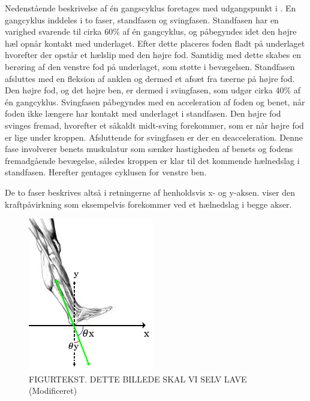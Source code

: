 Nedenstående beskrivelse af én gangscyklus foretages med udgangspunkt i . \newline
En gangcyklus inddeles i to faser, standfasen og svingfasen.
Standfasen har en varighed svarende til cirka 60\% af én gangcyklus, og påbegyndes idet den højre hæl opnår kontakt med underlaget. Efter dette placeres foden fladt på underlaget hvorefter der opstår et hælslip med den højre fod. Samtidig med dette skabes en berøring af den venstre fod på underlaget, som støtte i bevægelsen. Standfasen afsluttes med en fleksion af anklen og dermed et afsæt fra tæerne på højre fod.\citep{VaughanDavisOConnor1992,Whittle1990}  \newline 
Den højre fod, og det højre ben, er dermed i svingfasen, som udgør cirka 40\% af én gangcyklus. Svingfasen påbegyndes med en acceleration af foden og benet, når foden ikke længere har kontakt med underlaget i standfasen. Den højre fod svinges fremad, hvorefter et såkaldt midt-sving forekommer, som er når højre fod er lige under kroppen. Afsluttende for svingfasen er der en deacceleration. Denne fase involverer benets muskulatur som sænker hastigheden af benets og fodens fremadgående bevægelse, således kroppen er klar til det kommende hælnedslag i standfasen. Herefter gentages cyklusen for venstre ben.\citep{VaughanDavisOConnor1992,Whittle1990}

De to faser beskrives altså i retningerne af henholdsvis x- og y-aksen.  viser den kraftpåvirkning som eksempelvis forekommer ved et hælnedslag i begge akser.  

\begin{figure}[H]
	\centering
	\includegraphics[scale=0.7]{figures/bProblemloesning/kraefter_akser.png}
	\caption{FIGURTEKST. DETTE BILLEDE SKAL VI SELV LAVE \citep{XXXX} (Modificeret)}
	\label{fig:kraefter_akser}
\end{figure}


